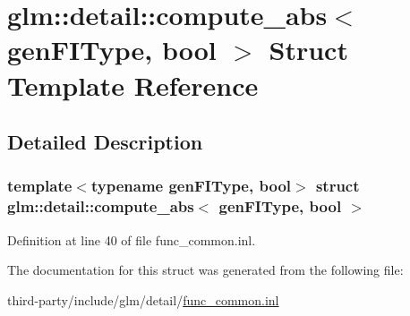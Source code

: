 \hypertarget{structglm_1_1detail_1_1compute__abs}{}\section{glm\+:\+:detail\+:\+:compute\+\_\+abs$<$ gen\+F\+I\+Type, bool $>$ Struct Template Reference}
\label{structglm_1_1detail_1_1compute__abs}


\subsection{Detailed Description}
\subsubsection*{template$<$typename gen\+F\+I\+Type, bool$>$\newline
struct glm\+::detail\+::compute\+\_\+abs$<$ gen\+F\+I\+Type, bool $>$}



Definition at line 40 of file func\+\_\+common.\+inl.



The documentation for this struct was generated from the following file\+:\begin{DoxyCompactItemize}
\item 
third-\/party/include/glm/detail/\hyperlink{func__common_8inl}{func\+\_\+common.\+inl}\end{DoxyCompactItemize}

